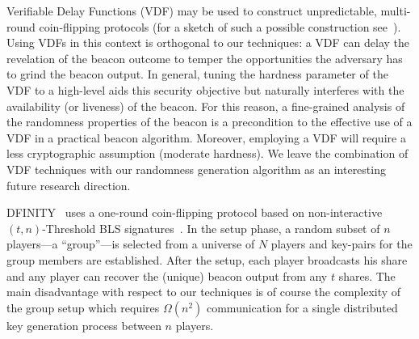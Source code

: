 Verifiable Delay Functions (VDF)
\cite{vdf-boneh,vdf-wesolowski,vdf-pietrzak} may be used to construct
unpredictable, multi-round coin-flipping protocols (for a sketch of
such a possible construction see~\cite{vdf-ethereum}). Using VDFs in
this context is orthogonal to our techniques: a VDF can delay the
revelation of the beacon outcome to temper the opportunities the
adversary has to grind the beacon output. In general, tuning the
hardness parameter of the VDF to a high-level aids this security
objective but naturally interferes with the availability (or liveness)
of the beacon.
For this reason, a fine-grained analysis of the
randomness properties of the beacon is a precondition to the effective
use of a VDF in a practical beacon algorithm. Moreover, employing a
VDF will require a less cryptographic assumption (moderate hardness).
We leave the combination of VDF techniques with our randomness
generation algorithm as an interesting future research direction.

DFINITY~\cite{DFINITY} uses a one-round coin-flipping protocol based
on non-interactive $(t,n)$-Threshold BLS signatures~\cite{BLS}. 
In the setup phase, a random subset of $n$
players---a ``group''---is selected from a universe of $N$
players  
and 
key-pairs for the group members are established. 
After the setup, 
each player broadcasts his share 
and any player can
recover the (unique) beacon output from any $t$ shares.
%
The main disadvantage with respect to our techniques is of course
the complexity of the group setup which requires $\Omega(n^2)$ communication
for a single distributed key generation process between $n$ players.



